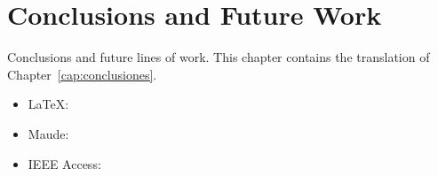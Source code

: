 
\chapter{Conclusions and Future Work}
\label{cap:conclusions}

Conclusions and future lines of work. This chapter contains the translation of Chapter~\ref{cap:conclusiones}.

\begin{itemize}
\item
\LaTeX:
\cite{latexCompanion,LaTeXLamport,BibTeXPracTex}
\cite{TeXShop}

\item
Maude:
\cite{maude30,DBLP:conf/birthday/ClavelDEELMT15,maude2007,CDELMM98}

\cite{DBLP:journals/jlp/Meseguer12}

\item
IEEE Access:
\cite{santos2019soft}

\end{itemize}


